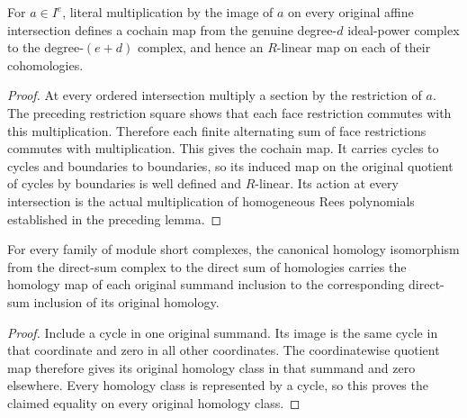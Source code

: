 \begin{lemma}
\label{lem:fc-rees-cech-homogeneous-multiplication}
\leanok
For $a\in I^e$, literal multiplication by the image of $a$ on every
original affine intersection defines a cochain map from the genuine
degree-$d$ ideal-power complex to the degree-$(e+d)$ complex, and hence
an $R$-linear map on each of their cohomologies.
\end{lemma}
\begin{proof}
At every ordered intersection multiply a section by the restriction of $a$.
The preceding restriction square shows that each face restriction commutes
with this multiplication. Therefore each finite alternating sum of face
restrictions commutes with multiplication. This gives the cochain map.
It carries cycles to cycles and boundaries to boundaries, so its induced
map on the original quotient of cycles by boundaries is well defined and
$R$-linear. Its action at every intersection is the actual multiplication
of homogeneous Rees polynomials established in the preceding lemma.
\end{proof}

\begin{lemma}
\label{lem:fc-formal-functions-direct-sum-inclusions}
\leanok
For every family of module short complexes, the canonical homology
isomorphism from the direct-sum complex to the direct sum of homologies
carries the homology map of each original summand inclusion to the
corresponding direct-sum inclusion of its original homology.
\end{lemma}
\begin{proof}
Include a cycle in one original summand. Its image is the same cycle
in that coordinate and zero in all other coordinates. The coordinatewise
quotient map therefore gives its original homology class in that summand
and zero elsewhere. Every homology class is represented by a cycle, so
this proves the claimed equality on every original homology class.
\end{proof}

